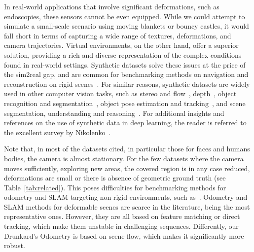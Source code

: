 \documentclass{article}
\begin{document}
In real-world applications that involve significant deformations, such as endoscopies, these sensors cannot be even equipped. While we could attempt to simulate a small-scale scenario using moving blankets or bouncy castles, it would fall short in terms of capturing a wide range of textures, deformations, and camera trajectories. Virtual environments, on the other hand, offer a superior solution, providing a rich and diverse representation of the complex conditions found in real-world settings.
Synthetic datasets solve these issues at the price of the sim2real gap, and are common for benchmarking methods on navigation and reconstruction on rigid scenes~\cite{handa2014benchmark,straub2019replica,wang2020tartanair,minoda2021viode, ramakrishnan2021habitat}. For similar reasons, synthetic datasets are widely used in other computer vision tasks, such as stereo and flow~\cite{baker2011database,butler2012naturalistic,dosovitskiy2015flownet,mayer2016large,ilg2018occlusions,mehl2023spring}, depth~\cite{carlucci2017deep,planche2017depthsynth}, object recognition and segmentation~\cite{chang2015shapenet}, object pose estimation and tracking~\cite{gaidon2016virtual}, and scene segmentation,  understanding and reasoning~\cite{mccormac2017scenenet,johnson2017clevr,roberts2021hypersim}. For additional insights and references on the use of synthetic data in deep learning, the reader is referred to the excellent survey by Nikolenko~\cite{nikolenko2019synthetic}.

Note that, in most of the datasets cited, in particular those for faces and humans bodies, the camera is almost stationary. For the few datasets where the camera moves sufficiently, exploring new areas, the covered region is in any case reduced, deformations are small or there is absence of geometric ground truth (see Table~\ref{tab:related}). This poses difficulties for benchmarking methods for odometry and SLAM targeting non-rigid environments, such as~\cite{lamarca2020defslam,recasens2021endo}. 
Odometry and SLAM methods for deformable scenes are scarce in the literature, being \cite{song2018mis,lamarca2020defslam,sengupta2021colonoscopic,recasens2021endo,gomez2021sd,shao2022self,lamarca2022direct,rodriguez2022tracking} the most representative ones. However, they are all based on feature matching or direct tracking, which make them unstable in challenging sequences. Differently, our Drunkard's Odometry is based on scene flow, which makes it significantly more robust. 
\end{document}
